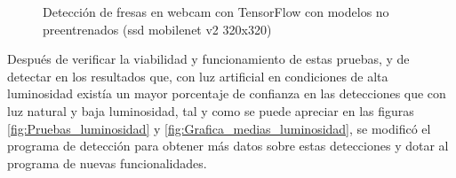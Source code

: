 \begin{figure}[H]
    \hspace{1mm}
    \hspace{1mm}
    
    \caption{Detección de fresas en webcam con TensorFlow con modelos no preentrenados (ssd mobilenet v2 320x320)}
    \label{fig:deteccion_Fresas_webcam_TF_ssdmobilenet}
\end{figure}

Después de verificar la viabilidad y funcionamiento de estas pruebas, y de detectar en los resultados que, con luz artificial en condiciones de alta luminosidad existía un mayor porcentaje de confianza en las detecciones que con luz natural y baja luminosidad, tal y como se puede apreciar en las figuras \ref{fig:Pruebas_luminosidad} y \ref{fig:Grafica_medias_luminosidad}, se modificó el programa de detección para obtener más datos sobre estas detecciones y dotar al programa de nuevas funcionalidades.

